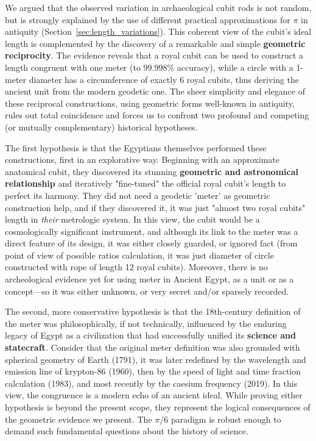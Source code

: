 \documentclass[11pt]{article}
\begin{document}
We argued that the observed variation in archaeological cubit rods is not random, but is strongly explained by the use of different practical approximations for $\pi$ in antiquity (Section~\ref{sec:length_variations}). This coherent view of the cubit's ideal length is complemented by the discovery of a remarkable and simple \textbf{geometric reciprocity}. The evidence reveals that a royal cubit can be used to construct a length congruent with one meter (to $99.998\%$ accuracy), while a circle with a 1-meter diameter has a circumference of exactly 6 royal cubits, thus deriving the ancient unit from the modern geodetic one. The sheer simplicity and elegance of these reciprocal constructions, using geometric forms well-known in antiquity, rules out total coincidence and forces us to confront two profound and competing (or mutually complementary) historical hypotheses.

The first hypothesis is that the Egyptians themselves performed these constructions, first in an explorative way. Beginning with an approximate anatomical cubit, they discovered its stunning \textbf{geometric and astronomical relationship} and iteratively "fine-tuned" the official royal cubit's length to perfect its harmony. They did not need a geodetic 'meter' as geometric construction help, and if they discovered it, it was just "almost two royal cubits" length in \textit{their} metrologic system. In this view, the cubit would be a cosmologically significant instrument, and although its link to the meter was a direct feature of its design, it was either closely guarded, or ignored fact (from point of view of possible ratios calculation, it was just diameter of circle constructed with rope of length 12 royal cubits). Moreover, there is no archeological evidence yet for using meter in Ancient Egypt, as a unit or as a concept—so it was either unknown, or very secret and/or sparsely recorded.

The second, more conservative hypothesis is that the 18th-century definition of the meter was philosophically, if not technically, influenced by the enduring legacy of Egypt as a civilization that had successfully unified its \textbf{science and statecraft}. Consider that the original meter definition was also grounded with spherical geometry of Earth (1791), it was later redefined by the wavelength and emission line of krypton-86 (1960), then by the speed of light and time fraction calculation (1983), and most recently by the caesium frequency (2019). In this view, the congruence is a modern echo of an ancient ideal. While proving either hypothesis is beyond the present scope, they represent the logical consequences of the geometric evidence we present. The $\pi/6$ paradigm is robust enough to demand such fundamental questions about the history of science.
\end{document}
